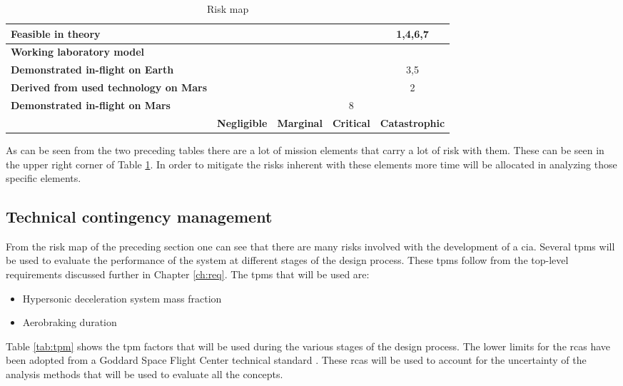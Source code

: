 \begin{table}[h]
\centering
\caption{Risk map}
\label{tab:riskmap}
    \begin{tabular}{|p{6.5cm}|c|c|c|c|}
    \hline
    \textbf{Feasible in theory} & \cellcolor{green} & \cellcolor{yellow} & \cellcolor{red} & \cellcolor{red} 1,4,6,7 \\ \hline
    \textbf{Working laboratory model} & \cellcolor{green} & \cellcolor{yellow} & \cellcolor{red} & \cellcolor{red} \\ \hline
    \textbf{Demonstrated in-flight on Earth} & \cellcolor{green} & \cellcolor{yellow} & \cellcolor{yellow} & \cellcolor{yellow} 3,5 \\ \hline
    \textbf{Derived from used technology on Mars} & \cellcolor{green} & \cellcolor{yellow} & \cellcolor{yellow} & \cellcolor{yellow} 2 \\ \hline
    \textbf{Demonstrated in-flight on Mars} & \cellcolor{green} & \cellcolor{green} & \cellcolor{green} 8 & \cellcolor{green} \\ \hline
     & \textbf{Negligible} & \textbf{Marginal} & \textbf{Critical} & \textbf{Catastrophic} \\ \hline
    \end{tabular}
\end{table}

As can be seen from the two preceding tables there are a lot of mission elements that carry a lot of risk with them. These can be seen in the upper right corner of Table \ref{tab:riskmap}. In order to mitigate the risks inherent with these elements more time will be allocated in analyzing those specific elements.

\subsection{Technical contingency management}
\label{sec:tca}
From the risk map of the preceding section one can see that there are many risks involved with the development of a \gls{cia}. Several \gls{tpm}s  will be used to evaluate the performance of the system at different stages of the design process. These \gls{tpm}s follow from the top-level requirements discussed further in Chapter \ref{ch:req}. The \gls{tpm}s that will be used are:
\begin{itemize}
	\item Hypersonic deceleration system mass fraction
	\item Aerobraking duration
\end{itemize}
Table \ref{tab:tpm} shows the \gls{tpm} factors that will be used during the various stages of the design process. The lower limits for the \gls{rca}s have been adopted from a Goddard Space Flight Center technical standard \cite{GoddardSpaceFlightCenter2013}. These \gls{rca}s will be used to account for the uncertainty of the analysis methods that will be used to evaluate all the concepts.

